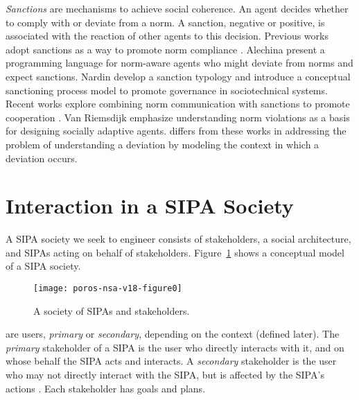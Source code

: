 \emph{Sanctions} are mechanisms to achieve social coherence.
An agent decides whether to comply with or deviate from a norm. A sanction, negative or positive, is associated with 
the reaction of other agents to this decision. Previous works adopt
sanctions as a way to promote norm compliance \citep{Noussair2005SanctionsAndCooperation,Egas2008AltruisticPunishment}. 
Alechina {\etal}  present
a programming language for norm-aware agents who might deviate from norms and
expect sanctions.  
Nardin {\etal} 
develop a sanction typology and introduce a conceptual sanctioning
process model to promote governance in sociotechnical systems. 
Recent works explore combining norm communication with sanctions to 
promote cooperation \citep{Andrighetto-2013-PunishVoice}. 
Van Riemsdijk {\etal}  emphasize 
understanding norm violations as a basis for designing socially adaptive agents. 
\frameworkB differs from these works in addressing the problem of understanding a deviation by modeling the context in which a deviation occurs.

\section{Interaction in a SIPA Society}%
\label{sec:Poros-framework}

A SIPA society we seek to engineer consists of stakeholders, a social architecture, and SIPAs acting on behalf of stakeholders. Figure~\ref{fig:Poros-model} shows a conceptual model of a SIPA society. %

\begin{figure}[!tb] \centering

\texttt{[image: poros-nsa-v18-figure0]}
\caption[A society of SIPAs and stakeholders]{A society of SIPAs and stakeholders.}
\label{fig:Poros-model} 
\end{figure}

 are users, \emph{primary} or \emph{secondary}, depending on the context (defined later).
The \emph{primary} stakeholder of a SIPA is the user who directly interacts with it, and on whose behalf the SIPA acts and interacts.
A \emph{secondary} stakeholder is the user who may not directly interact with the SIPA, but is affected by the SIPA's actions \citep{Ajmeri-AAMAS17-Arnor}. 
Each stakeholder has goals and plans.

